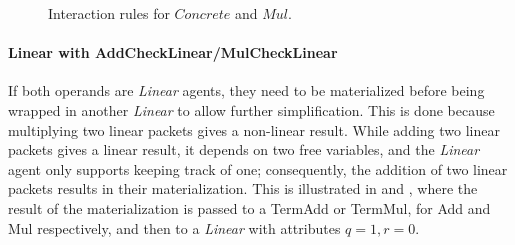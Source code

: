 \begin{figure}[H]
	\centering
	\caption{Interaction rules for $\mathit{Concrete}$ and $\mathit{Mul}$.}
	\label{fig:rule-concrete-mul}
\end{figure}

\paragraph{Linear with AddCheckLinear/MulCheckLinear}
If both operands are \textit{Linear} agents, they need to be materialized before being wrapped in another
\textit{Linear} to allow further simplification. This is done because multiplying two linear packets
gives a non-linear result.
While adding two linear packets gives a linear result, it depends on two free variables, and the
\textit{Linear} agent only supports keeping track of one; consequently, the addition of two linear packets
results in their materialization.
This is illustrated in \textbf{}
and \textbf{}, where the result of the materialization is passed
to a TermAdd or TermMul, for Add and Mul respectively, and then to a \textit{Linear} with attributes
$q=1,r=0$.

